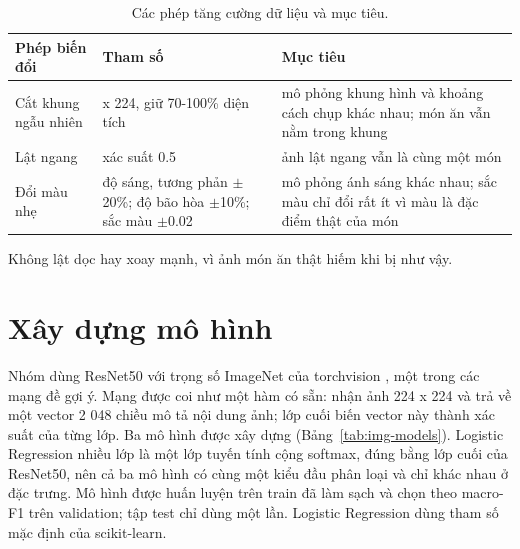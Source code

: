 \begin{table}[H]\centering
\caption{Các phép tăng cường dữ liệu và mục tiêu.}\label{tab:img-aug}
\begin{tabular}{>{\raggedright\arraybackslash}p{3.4cm}>{\raggedright\arraybackslash}p{4.4cm}>{\raggedright\arraybackslash}p{6.4cm}}
\toprule
Phép biến đổi & Tham số & Mục tiêu \\
\midrule
Cắt khung ngẫu nhiên & 224 x 224, giữ 70-100\% diện tích & mô phỏng khung hình và khoảng cách chụp khác nhau; món ăn vẫn nằm trong khung \\
Lật ngang & xác suất 0.5 & ảnh lật ngang vẫn là cùng một món \\
Đổi màu nhẹ & độ sáng, tương phản $\pm$20\%; độ bão hòa $\pm$10\%; sắc màu $\pm$0.02 & mô phỏng ánh sáng khác nhau; sắc màu chỉ đổi rất ít vì màu là đặc điểm thật của món \\
\bottomrule
\end{tabular}
\end{table}

Không lật dọc hay xoay mạnh, vì ảnh món ăn thật hiếm khi bị như vậy.


\section{Xây dựng mô hình}

Nhóm dùng ResNet50 với trọng số ImageNet của torchvision \cite{img-resnet}, một trong các mạng đề gợi ý. Mạng được coi
như một hàm có sẵn: nhận ảnh 224 x 224 và trả về một vector 2 048 chiều mô tả nội dung ảnh; lớp cuối biến vector này
thành xác suất của từng lớp. Ba mô hình được xây dựng (Bảng~\ref{tab:img-models}). Logistic Regression nhiều lớp là một
lớp tuyến tính cộng softmax, đúng bằng lớp cuối của ResNet50, nên cả ba mô hình có cùng một kiểu đầu phân loại và chỉ
khác nhau ở đặc trưng. Mô hình được huấn luyện trên train đã làm sạch và chọn theo macro-F1 trên validation; tập test
chỉ dùng một lần. Logistic Regression dùng tham số mặc định của scikit-learn.

